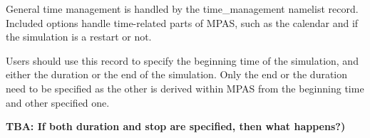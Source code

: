 General time management is handled by the time\_management namelist record.
Included options handle time-related parts of MPAS, such as the calendar and if the simulation is a restart or not.

Users should use this record to specify the beginning time of the simulation,
and either the duration or the end of the simulation. Only the end or the
duration need to be specified as the other is derived within MPAS from the
beginning time and other specified one.

{\bf TBA: If both duration and stop are specified, then what happens?)}
